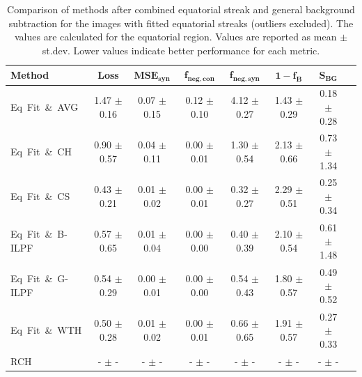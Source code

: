 \documentclass[iucr]{iucrjournals}
\begin{document}
\begin{table}[t]%
\centering
\small
\setlength{\tabcolsep}{4pt}
\renewcommand{\arraystretch}{1.3}
\begin{tabular}{@{}lccccccc@{}}
\toprule
\textbf{Method} & \textbf{Loss} &
$\mathbf{MSE}_{\mathbf{syn}}$ &
$\mathbf{f}_{\mathbf{neg,con}}$ &
$\mathbf{f}_{\mathbf{neg,syn}}$ &
$\mathbf{1-f_B}$ &
$\mathbf{S}_{\mathbf{BG}}$ \\ \midrule

Eq~Fit~\&~AVG  & 1.47 $\pm$ 0.16 & 0.07 $\pm$ 0.15 & 0.12 $\pm$ 0.10 & 4.12 $\pm$ 0.27 & 1.43 $\pm$ 0.29 & 0.18 $\pm$ 0.28 \\
Eq~Fit~\&~CH  & 0.90 $\pm$ 0.57 & 0.04 $\pm$ 0.11 & 0.00 $\pm$ 0.01 & 1.30 $\pm$ 0.54 & 2.13 $\pm$ 0.66 & 0.73 $\pm$ 1.34 \\
Eq~Fit~\&~CS  & 0.43 $\pm$ 0.21 & 0.01 $\pm$ 0.02 & 0.00 $\pm$ 0.01 & 0.32 $\pm$ 0.27 & 2.29 $\pm$ 0.51 & 0.25 $\pm$ 0.34 \\
Eq~Fit~\&~B-ILPF  & 0.57 $\pm$ 0.65 & 0.01 $\pm$ 0.04 & 0.00 $\pm$ 0.00 & 0.40 $\pm$ 0.39 & 2.10 $\pm$ 0.54 & 0.61 $\pm$ 1.48 \\
Eq~Fit~\&~G-ILPF  & 0.54 $\pm$ 0.29 & 0.00 $\pm$ 0.01 & 0.00 $\pm$ 0.00 & 0.54 $\pm$ 0.43 & 1.80 $\pm$ 0.57 & 0.49 $\pm$ 0.52 \\
Eq~Fit~\&~WTH & 0.50 $\pm$ 0.28 & 0.01 $\pm$ 0.02 & 0.00 $\pm$ 0.01 & 0.66 $\pm$ 0.65 & 1.91 $\pm$ 0.57 & 0.27 $\pm$ 0.33 \\
{\color{blue} RCH} & {\color{blue} - $\pm$ -} & {\color{blue} - $\pm$ -} & {\color{blue}- $\pm$ -} & {\color{blue}- $\pm$ -} & {\color{blue} - $\pm$ -} & {\color{blue} - $\pm$ -} \\
\bottomrule
\end{tabular}


\caption{Comparison of methods after combined equatorial streak and general background subtraction for the images with fitted equatorial streaks (outliers excluded). The values are calculated for the equatorial region. Values are reported as mean $\pm$ st.dev. Lower values indicate better performance for each metric.}
\label{tab:combined_eq_general}
\end{table}
\end{document}
